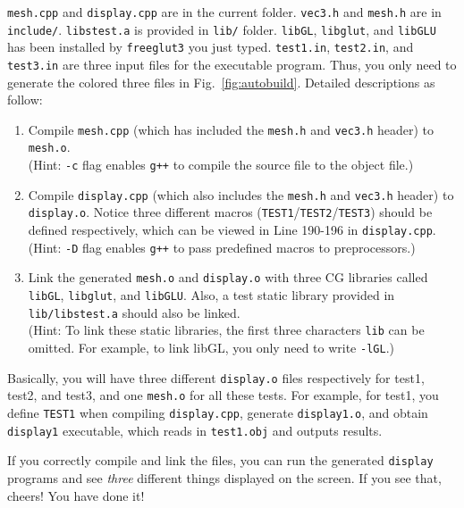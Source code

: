 \documentclass[english]{../TexTemplate/thesis}
\begin{document}
\verb'mesh.cpp' and \verb'display.cpp' are in the current folder.
\verb'vec3.h' and \verb'mesh.h' are in \verb'include/'.
\verb'libstest.a' is provided in \verb'lib/' folder.
\verb'libGL', \verb'libglut', and \verb'libGLU' has been installed by \verb'freeglut3' you just typed.
\verb'test1.in', \verb'test2.in', and \verb'test3.in' are three input files for the executable program.
Thus, you only need to generate the colored three files in Fig.~\ref{fig:autobuild}.
Detailed descriptions as follow:
\begin{enumerate}
\item Compile \verb'mesh.cpp' (which has included the \verb'mesh.h' and \verb'vec3.h' header) to \verb'mesh.o'.\\
(Hint: \verb'-c' flag enables \verb'g++' to compile the source file to the object file.)
\item Compile \verb'display.cpp' (which also includes the \verb'mesh.h' and \verb'vec3.h' header) to \verb'display.o'.
Notice three different macros (\verb'TEST1'/\verb'TEST2'/\verb'TEST3') should be defined respectively, which can be viewed in Line 190-196 in \verb'display.cpp'.\\
(Hint: \verb'-D' flag enables \verb'g++' to pass predefined macros to preprocessors.)
\item Link the generated \verb'mesh.o' and \verb'display.o' with three CG libraries called \verb'libGL', \verb'libglut', and \verb'libGLU'.
Also, a test static library provided in \verb'lib/libstest.a' should also be linked.\\
(Hint: To link these static libraries, the first three characters \verb'lib' can be omitted. For example, to link libGL, you only need to write \verb'-lGL'.)
\end{enumerate}

Basically, you will have three different \verb'display.o' files respectively for test1, test2, and test3, and one \verb'mesh.o' for all these tests.
For example, for test1, you define \verb'TEST1' when compiling \verb'display.cpp', generate \verb'display1.o', and obtain \verb'display1' executable, which reads in \verb'test1.obj' and outputs results.

If you correctly compile and link the files, you can run the generated \verb'display' programs and see \emph{three} different things displayed on the screen.
If you see that, cheers! You have done it!

\bigskip
\end{document}
